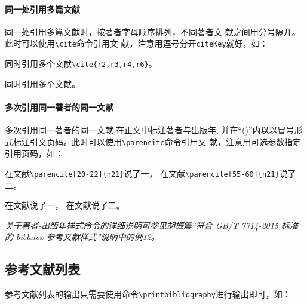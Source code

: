 \documentclass{article}
\newcommand\cs[1]{\texttt{\textbackslash#1}}
\newcommand{\note}[1]{{%
  \color{magenta}{\noindent\bfseries 注意：}\emph{#1}}}
\begin{document}
\paragraph{同一处引用多篇文献}

同一处引用多篇文献时，按著者字母顺序排列，不同著者文
献之间用分号隔开。此时可以使用\cs{cite}命令引用文
献，注意用逗号分开\texttt{citeKey}就好，如：

\begin{center}
  \begin{minipage}{0.45\textwidth}
    \small
    同时引用多个文献\verb|\cite{r2,r3,r4,r6}|。%
  \end{minipage}
  \begin{boxedminipage}{0.45\textwidth}
    \small
    同时引用多个文献\cite{r2,r3,r4,r6}。%
  \end{boxedminipage}
\end{center}

\paragraph{多次引用同一著者的同一文献}

多次引用同一著者的同一文献,在正文中标注著者与出版年,
并在\enquote{()}内以以冒号形式标注引文页码。此时可以使用\cs{parencite}命令引用文
献，注意用可选参数指定引用页码，如：

\begin{center}
  \begin{minipage}{0.45\textwidth}
    \small
    在文献\verb|\parencite[20-22]{n21}|说了一， 在文献\verb|\parencite[55-60]{n21}|说了二。%
  \end{minipage}
  \begin{boxedminipage}{0.45\textwidth}
    \small
    在文献\parencite[20-22]{n21}说了一， 在文献\parencite[55-60]{n21}说了二。%
  \end{boxedminipage}
\end{center}

\note{关于著者-出版年样式命令的详细说明可参见胡振震\enquote{符合 GB/T
  7714-2015 标准的 biblatex 参考文献样式}说明中的例12。}

\subsection{参考文献列表}

参考文献列表的输出只需要使用命令\cs{printbibliography}进行输出即可，如：

\nocite{达尔文1896,广西壮族自治区林业厅1993--,r4,张若凌2004--,Miroslav2004--,于潇2012-1518-1523,马克思2013-302-302,张田勤2000--,萧钰2001--,刘加林1993--}
\printbibliography%
\end{document}

